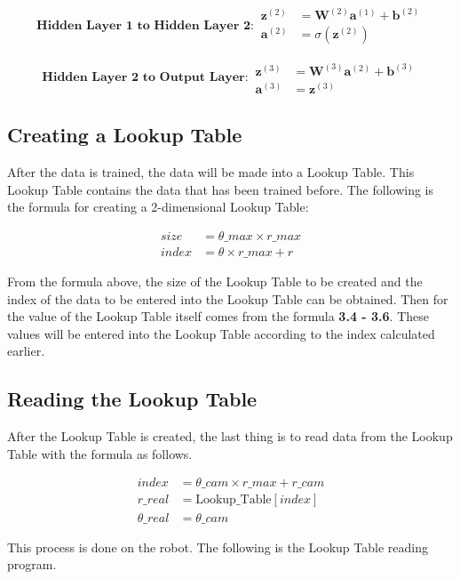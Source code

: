 \begin{equation}
  \textbf{Hidden Layer 1 to Hidden Layer 2}:
  \begin{aligned}
    \mathbf{z}^{(2)} &= \mathbf{W}^{(2)} \mathbf{a}^{(1)} + \mathbf{b}^{(2)} \\
    \mathbf{a}^{(2)} &= \sigma(\mathbf{z}^{(2)})
  \end{aligned}
\end{equation}

\begin{equation}
  \textbf{Hidden Layer 2 to Output Layer}:
  \begin{aligned}
    \mathbf{z}^{(3)} &= \mathbf{W}^{(3)} \mathbf{a}^{(2)} + \mathbf{b}^{(3)} \\
    \mathbf{a}^{(3)} &= \mathbf{z}^{(3)}
  \end{aligned}
\end{equation}

\subsection{Creating a Lookup Table
  \label{sec:pembuatanlut}}

After the data is trained, the data will be made into a Lookup Table. This Lookup Table contains the data that has been trained before. The following is the formula for creating a 2-dimensional Lookup Table:

\begin{equation}
  \begin{aligned}
    size &= \theta\_max \times r\_max \\
    index &= \theta \times r\_max + r
  \end{aligned}
\end{equation}

From the formula above, the size of the Lookup Table to be created and the index of the data to be entered into the Lookup Table can be obtained.
Then for the value of the Lookup Table itself comes from the formula \textbf{3.4 - 3.6}. These values will be entered into the Lookup Table according to the index calculated earlier.

\subsection{Reading the Lookup Table
  \label{sec:pembacaanlut}}

After the Lookup Table is created, the last thing is to read data from the Lookup Table with the formula as follows.

\begin{equation}
  \begin{aligned}
    index &= \theta\_cam \times r\_max + r\_cam \\
    r\_real &= \text{Lookup\_Table}[index] \\
    \theta\_real &= \theta\_cam
  \end{aligned}
\end{equation}

This process is done on the robot. The following is the Lookup Table reading program.





